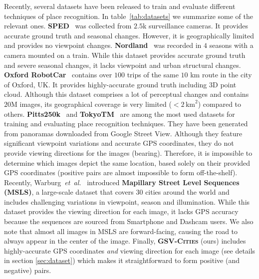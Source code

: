 \documentclass{article}
\newcommand{\etal}{\textit{et~al.}}
\begin{document}
Recently, 
several datasets have been released to train and evaluate different techniques of place recognition. In table~\ref{tab:datasets} we summarize some of the relevant ones. \textbf{SPED}~\cite{chen2017deep} was collected from $2.5$k surveillance cameras. It provides accurate ground truth and seasonal changes. However, it is geographically limited and provides no viewpoint changes. \textbf{Nordland}~\cite{olid2018single} was recorded in $4$ seasons with a camera mounted on a train. While this dataset provides accurate ground truth and severe seasonal changes, it lacks viewpoint and urban structural changes. \textbf{Oxford RobotCar}~\cite{maddern20171} contains over $100$ trips of the same $10$ km route in the city of Oxford, UK. It provides highly-accurate ground truth including 3D point cloud. Although this dataset comprises a lot of perceptual changes and contains $20$M images, its geographical coverage is very limited ($<2\,\text{km}^2$) compared to others. \textbf{Pitts250k}~\cite{torii2013visual} and \textbf{TokyoTM}~\cite{torii201524} are among the most used datasets for training and evaluating place recognition techniques. They have been generated from panoramas downloaded from Google Street View. Although they feature significant viewpoint variations and accurate GPS coordinates, they do not provide viewing directions for the images (bearing). Therefore, it is impossible to determine which images depict the same location, based solely on their provided GPS coordinates (positive pairs are almost impossible to form off-the-shelf). Recently, Warburg~\etal~\cite{warburg2020mapillary} introduced \textbf{Mapillary Street Level Sequences (MSLS)}, a large-scale dataset that covers $30$ cities around the world and includes challenging variations in viewpoint, season and illumination. While this dataset provides the viewing direction for each image, it lacks GPS accuracy because the sequences are sourced from Smartphone and Dashcam users. We also note that almost all images in MSLS are forward-facing, causing the road to always appear in the center of the image. Finally, \textsc{\textbf{GSV-Cities}} (ours) includes highly-accurate GPS coordinates \emph{and} viewing direction for each image (see details in section \ref{sec:dataset}) which makes it straightforward to form positive (and negative) pairs.
\end{document}
